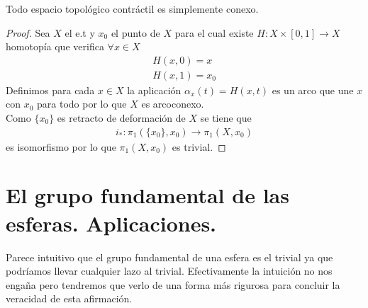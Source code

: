 \begin{coro}
    Todo espacio topológico contráctil es simplemente conexo.
    \begin{proof}
        Sea $X$ el e.t y $x_0$ el punto de $X$ para el cual existe $H:X\times[0,1] \to X$ homotopía que verifica $\forall x \in X$
        \begin{gather*}
            H(x,0) = x\\
            H(x,1) = x_0
        \end{gather*}
        Definimos para cada $x\in X$ la aplicación $\alpha_x(t)=H(x,t)$ es un arco que une $x$ con $x_0$ para todo por lo que $X$ es arcoconexo.\\

        Como $\{x_0\}$ es retracto de deformación de $X$ se tiene que 
        \begin{gather*}
            i_*:\pi_1(\{x_0\},x_0) \to \pi_1(X,x_0)
        \end{gather*}
        es isomorfismo por lo que $\pi_1(X,x_0)$ es trivial.
    \end{proof}
\end{coro}

\section{El grupo fundamental de las esferas. Aplicaciones.}

Parece intuitivo que el grupo fundamental de una esfera es el trivial ya que podríamos llevar cualquier lazo al trivial. Efectivamente la intuición no nos engaña pero tendremos que verlo de una forma más rigurosa para concluir la veracidad de esta afirmación.

